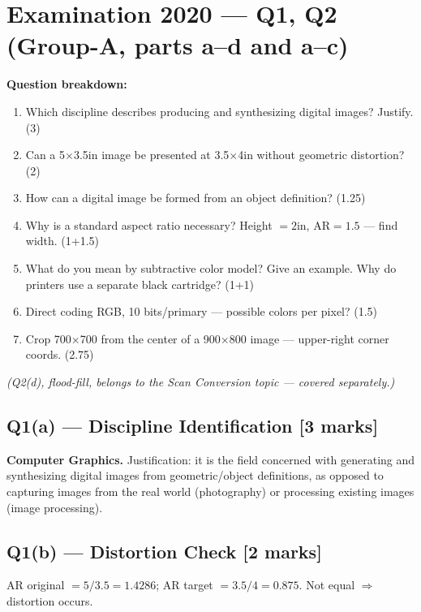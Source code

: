 \documentclass[12pt, a4paper]{article}
\newenvironment{solutionbox}{\begin{mdframed}[style=solutionframe]}{\end{mdframed}}
\newenvironment{answerbox}{\begin{mdframed}[style=answerframe]}{\end{mdframed}}
\begin{document}
\section{Examination 2020 --- Q1, Q2 (Group-A, parts a--d and a--c)}

\begin{solutionbox}
\textbf{Question breakdown:}
\begin{enumerate}[noitemsep]
  \item[Q1(a)] Which discipline describes producing and synthesizing digital images? Justify. (3)
  \item[Q1(b)] Can a 5$\times$3.5in image be presented at 3.5$\times$4in without geometric distortion? (2)
  \item[Q1(c)] How can a digital image be formed from an object definition? (1.25)
  \item[Q1(d)] Why is a standard aspect ratio necessary? Height $=2$in, AR$=1.5$ --- find width. (1+1.5)
  \item[Q2(a)] What do you mean by subtractive color model? Give an example. Why do printers use a separate black cartridge? (1+1)
  \item[Q2(b)] Direct coding RGB, 10 bits/primary --- possible colors per pixel? (1.5)
  \item[Q2(c)] Crop 700$\times$700 from the center of a 900$\times$800 image --- upper-right corner coords. (2.75)
\end{enumerate}
\emph{(Q2(d), flood-fill, belongs to the Scan Conversion topic --- covered separately.)}
\end{solutionbox}

\subsection*{Q1(a) --- Discipline Identification [3 marks]}
\begin{answerbox}
\textbf{Computer Graphics.} Justification: it is the field concerned with generating and synthesizing digital images from geometric/object definitions, as opposed to capturing images from the real world (photography) or processing existing images (image processing).
\end{answerbox}

\subsection*{Q1(b) --- Distortion Check [2 marks]}
\begin{answerbox}
AR original $=5/3.5=1.4286$; AR target $=3.5/4=0.875$. Not equal $\Rightarrow$ distortion occurs.
\end{answerbox}
\end{document}

